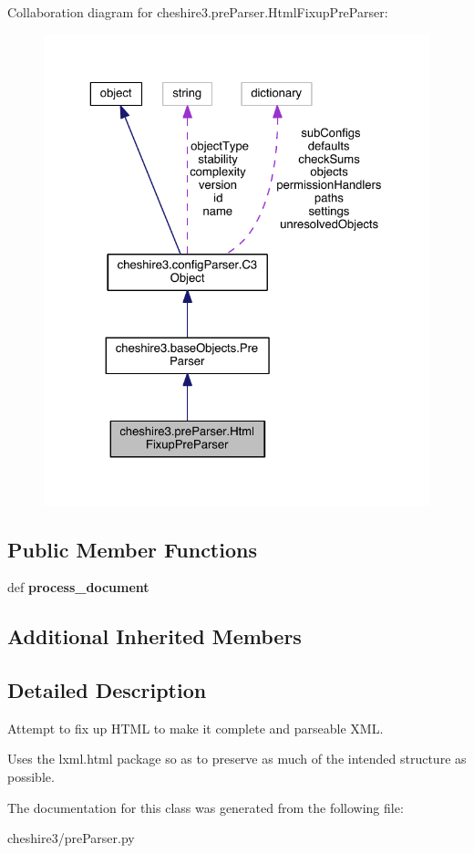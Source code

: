 Collaboration diagram for cheshire3.\-pre\-Parser.\-Html\-Fixup\-Pre\-Parser\-:
\nopagebreak
\begin{figure}[H]
\begin{center}
\leavevmode
\includegraphics[width=325pt]{classcheshire3_1_1pre_parser_1_1_html_fixup_pre_parser__coll__graph}
\end{center}
\end{figure}
\subsection*{Public Member Functions}
\begin{DoxyCompactItemize}
\item 
\hypertarget{classcheshire3_1_1pre_parser_1_1_html_fixup_pre_parser_ae6ba0872e96d8640e31ce94731e0f1ee}{def {\bfseries process\-\_\-document}}\label{classcheshire3_1_1pre_parser_1_1_html_fixup_pre_parser_ae6ba0872e96d8640e31ce94731e0f1ee}

\end{DoxyCompactItemize}
\subsection*{Additional Inherited Members}


\subsection{Detailed Description}
\begin{DoxyVerb}Attempt to fix up HTML to make it complete and parseable XML.

Uses the lxml.html package so as to preserve as much of the intended
structure as possible.
\end{DoxyVerb}
 

The documentation for this class was generated from the following file\-:\begin{DoxyCompactItemize}
\item 
cheshire3/pre\-Parser.\-py\end{DoxyCompactItemize}

